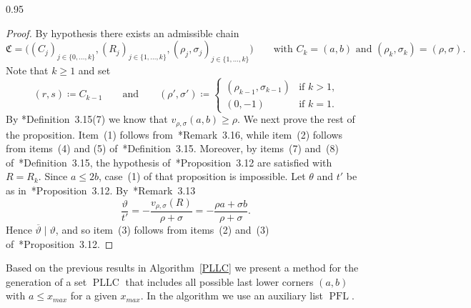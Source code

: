 \documentclass[reqno,a4paper,twoside]{amsart}
\theoremstyle{definition}
\theoremstyle{remark}
\newcommand{\ov}{\overline}
\DeclareMathOperator{\PFL}{PFL}
\DeclareMathOperator{\PLLC}{PLLC}
\begin{document}
\begin{spacing}{0.95}
\begin{proof}
By hypothesis there exists an admissible chain
$$
\mathfrak{C}=\bigl((C_j)_{j\in\{0,\dots,k\}},(R_j)_{j\in\{1,\dots,k\}},(\rho_j,\sigma_j)_{j\in\{1,\dots,k\}}\bigr) \qquad\text{with $C_k = (a,b)$ and $(\rho_k,\sigma_k) = (\rho,\sigma)$.}
$$
Note that $k\ge 1$ and set
$$
(r,s) \coloneqq C_{k-1}\qquad\text{and}\qquad (\rho',\sigma')\coloneqq \begin{cases}(\rho_{k-1},\sigma_{k-1}) & \text{if $k>1$,}\\(0,-1) & \text{if $k=1$.} \end{cases}
$$
By \cite{GGV2}*{Definition~3.15(7)} we know that $v_{\rho,\sigma}(a,b) \ge \rho$. We next prove the rest of the proposition. Item~(1) follows from~\cite{GGV2}*{Remark~3.16}, while item~(2) follows from items~(4) and (5) of~\cite{GGV2}*{Def\-inition~3.15}. Moreover, by items~(7) and~(8) of~\cite{GGV2}*{Def\-inition~3.15}, the hypothesis of~\cite{GGV2}*{Propo\-sition~3.12} are satisfied with $R=R_k$. Since $a \leq 2b$, case~(1) of that proposition is impossible. Let $\theta$ and $t'$ be as in~\cite{GGV2}*{Proposition~3.12}. By~\cite{GGV2}*{Remark~3.13}
$$
\frac{\vartheta}{t'}=-\frac{v_{\rho,\sigma}(R)}{\rho+\sigma}  = -\frac{\rho a+\sigma b}{\rho+\sigma}.
$$
Hence $\ov{\vartheta}\mid \vartheta$, and so item~(3) follows from items~(2) and~(3) of~\cite{GGV2}*{Proposition~3.12}.
\end{proof}


Based on the previous results in Algorithm~\ref{PLLC} we present a method for the generation of a set $\PLLC$ that includes all possible last lower corners $(a,b)$ with $a\le x_{max}$ for a given $x_{max}$. In the algorithm we use an auxiliary list $\PFL$.



\end{spacing}
\end{document}
